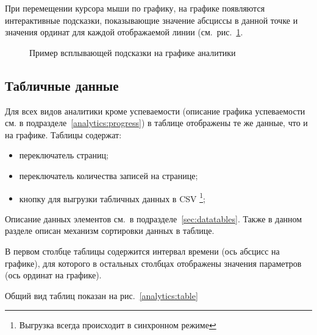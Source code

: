 При перемещении курсора мыши по графику, на графике появляются интерактивные подсказки, показывающие
значение абсциссы в данной точке и значения ординат для каждой отображаемой линии (см.\ рис.~\ref{analytics:chart:tooltip}.

\begin{figure}[H]
	\caption{Пример всплывающей подсказки на графике аналитики}
	\label{analytics:chart:tooltip}
\end{figure}

\subsection{Табличные данные}
\label{analytics:tables}

Для всех видов аналитики кроме успеваемости (описание графика успеваемости см. в подразделе~\ref{analytics:progress})
в таблице отображены те же данные, что и на графике. Таблицы содержат:
\begin{itemize}
	\item переключатель страниц;
 	\item переключатель количества записей на странице;
 	\item кнопку  для выгрузки табличных данных в 
 	CSV \footnote{Выгрузка всегда происходит в синхронном режиме};
\end{itemize} 
Описание данных элементов см.\ в подразделе~\ref{sec:datatables}. Также в данном разделе описан механизм
сортировки данных в таблице. 

В первом столбце таблицы содержится интервал времени (ось абсцисс на графике), для которого в 
остальных столбцах отображены значения параметров (ось ординат на графике).

Общий вид таблиц показан на рис.~\ref{analytics:table}

